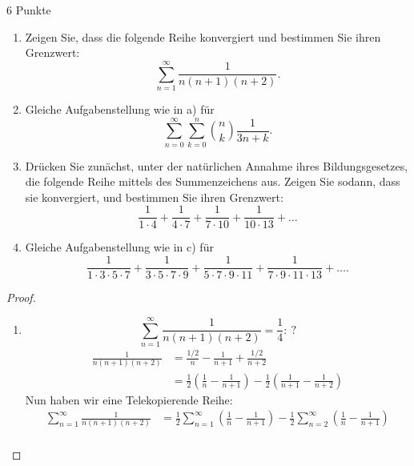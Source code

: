 \documentclass{problemset}
\author{Michael van Straten}
\begin{document}
\maketitle

\begin{problem}{6 Punkte}
\begin{enumerate}
    \item Zeigen Sie, dass die folgende Reihe konvergiert und bestimmen Sie ihren Grenzwert:
          \[
              \sum_{n=1}^{\infty} \frac{1}{n(n + 1)(n + 2)}.
          \]
    \item Gleiche Aufgabenstellung wie in a) für
          \[
              \sum_{n=0}^{\infty} \sum_{k=0}^{n} {n \choose k} \frac{1}{3n+k}.
          \]
    \item Drücken Sie zunächst, unter der natürlichen Annahme ihres Bildungsgesetzes, die folgende Reihe mittels des Summenzeichens aus. Zeigen Sie sodann, dass sie konvergiert, und bestimmen Sie ihren Grenzwert:
          \[
              \frac{1}{1 \cdot 4 } + \frac{1}{4 \cdot 7 } + \frac{1}{7 \cdot 10} + \frac{1}{10 \cdot 13} + \ldots
          \]
    \item Gleiche Aufgabenstellung wie in c) für
          \[
              \frac{1}{1 \cdot 3 \cdot 5 \cdot 7 } + \frac{1}{3 \cdot 5 \cdot 7 \cdot 9} + \frac{1}{5 \cdot 7 \cdot 9 \cdot 11} + \frac{1}{7 \cdot 9 \cdot 11 \cdot 13} + \ldots.
          \]
\end{enumerate}
\begin{proof}
    \begin{enumerate}
        \item
              \[
                  \sum_{n = 1}^{\infty}\frac{1}{n(n + 1)(n + 2)} = \frac{1}{4}:\ ?
              \]
              \begin{align}
                  \frac{1}{n(n + 1)(n + 2)} & = \frac{1/2}{n} - \frac{1}{n + 1} + \frac{1/2}{n + 2}                                                               \\
                                            & = \frac{1}{2}\left(\frac{1}{n} - \frac{1}{n + 1}\right) - \frac{1}{2}\left(\frac{1}{n + 1} - \frac{1}{n + 2}\right)
              \end{align}
              Nun haben wir eine Telekopierende Reihe:
              \begin{align}
                  \sum_{n = 1}^{\infty}\frac{1}{n(n + 1)(n + 2)} & = \frac{1}{2}\sum_{n = 1}^{\infty}\left(\frac{1}{n} - \frac{1}{n + 1}\right) - \frac{1}{2}\sum_{n = 2}^{\infty}\left(\frac{1}{n} - \frac{1}{n + 1}\right) \\

\end{align}
\end{enumerate}
\end{proof}
\end{problem}
\end{document}

